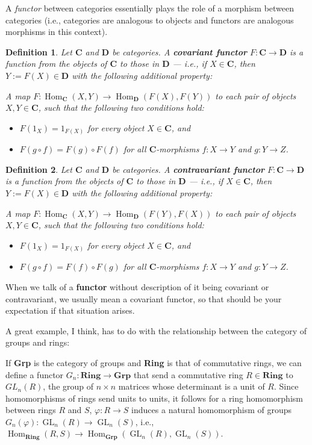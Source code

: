 \documentclass[12pt,reqno]{amsart}
\theoremstyle{plain}
\newtheorem{defi}{Definition}
\newcommand{\cat}{\mathbf{C}}
\DeclareMathOperator{\GL}{GL}
\DeclareMathOperator{\Hom}{Hom}
\begin{document}
A \textit{functor} between categories essentially plays the role of a morphism between categories (i.e., categories are analogous to objects and functors are analogous morphisms in this context).  
\begin{defi} Let $\cat$ and $\mathbf{D}$ be categories. A \textbf{covariant functor} $ F \colon \cat \to \mathbf{D}$ is a function from the objects of $\cat$ to those in $\mathbf{D}$ — i.e., if $X \in \cat$, then $Y := F(X) \in \mathbf{D}$ with the following additional property:

A map $F: \Hom_{\cat} (X, Y) \to \Hom_{\mathbf{D}} (F (X), F(Y))$ to each pair of objects $X, Y \in \cat$, such that the following two conditions hold:

\begin{itemize}
\item[$(i)$] $F (1_X) = 1_{F(X)}$ for every object $X \in \cat$, and 
\item[$(ii)$] $F (g \circ f) = F (g) \circ F(f)$ for all $\cat$-morphisms $f \colon X \to Y$ and $g \colon Y \to Z$. 
\end{itemize}
\end{defi} 
\begin{defi} Let $\cat$ and $\mathbf{D}$ be categories. A \textbf{contravariant functor} $ F \colon \cat \to \mathbf{D}$ is a function from the objects of $\cat$ to those in $\mathbf{D}$ — i.e., if $X \in \cat$, then $Y := F(X) \in \mathbf{D}$ with the following additional property:

A map $F: \Hom_{\cat} (X, Y) \to \Hom_{\mathbf{D}} (F (Y), F(X))$ to each pair of objects $X, Y \in \cat$, such that the following two conditions hold:

\begin{itemize}
\item[$(i)$] $F (1_X) = 1_{F(X)}$ for every object $X \in \cat$, and 
\item[$(ii)$] $F (g \circ f) = F (f) \circ F(g)$ for all $\cat$-morphisms $f \colon X \to Y$ and $g \colon Y \to Z$. 
\end{itemize}
\end{defi} 

When we talk of a \textbf{functor} without description of it being covariant or contravariant, we usually mean a covariant functor, so that should be your expectation if that situation arises. 

A great example, I think, has to do with the relationship between the category of groups and rings:

If \textbf{Grp} is the category of groups and \textbf{Ring} is that of commutative rings, we can define a functor $G_n \colon \mathbf{Ring} \to \mathbf{Grp}$ that send a commutative ring $R \in \mathbf{Ring}$ to $GL_{n} (R)$, the group of $n \times n$ matrices whose determinant is a unit of $R$. Since homomorphisms of rings send units to units, it follows for a ring homomorphism between rings $R$ and $S$, $\varphi \colon R \to S$ induces a natural homomorphism of groups $G_n (\varphi) \colon \GL_{n} (R) \to \GL_n (S)$, i.e., $\Hom_{\mathbf{Ring}} (R, S) \to \Hom_{\mathbf{Grp}} ( \GL_n (R), \GL_n (S))$. 
\end{document}
